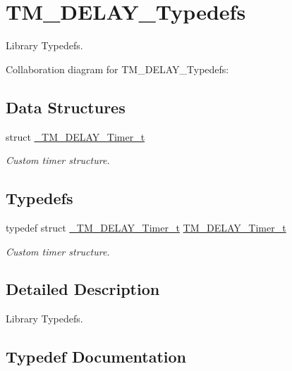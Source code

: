 \hypertarget{group___t_m___d_e_l_a_y___typedefs}{}\section{T\+M\+\_\+\+D\+E\+L\+A\+Y\+\_\+\+Typedefs}
\label{group___t_m___d_e_l_a_y___typedefs}


Library Typedefs.  


Collaboration diagram for T\+M\+\_\+\+D\+E\+L\+A\+Y\+\_\+\+Typedefs\+:
\subsection*{Data Structures}
\begin{DoxyCompactItemize}
\item 
struct \hyperlink{struct___t_m___d_e_l_a_y___timer__t}{\+\_\+\+T\+M\+\_\+\+D\+E\+L\+A\+Y\+\_\+\+Timer\+\_\+t}
\begin{DoxyCompactList}\small\item\em Custom timer structure. \end{DoxyCompactList}\end{DoxyCompactItemize}
\subsection*{Typedefs}
\begin{DoxyCompactItemize}
\item 
typedef struct \hyperlink{struct___t_m___d_e_l_a_y___timer__t}{\+\_\+\+T\+M\+\_\+\+D\+E\+L\+A\+Y\+\_\+\+Timer\+\_\+t} \hyperlink{group___t_m___d_e_l_a_y___typedefs_gaf0beeb077a757f34c8b176464d9a0e85}{T\+M\+\_\+\+D\+E\+L\+A\+Y\+\_\+\+Timer\+\_\+t}
\begin{DoxyCompactList}\small\item\em Custom timer structure. \end{DoxyCompactList}\end{DoxyCompactItemize}


\subsection{Detailed Description}
Library Typedefs. 



\subsection{Typedef Documentation}
\mbox{\label{group___t_m___d_e_l_a_y___typedefs_gaf0beeb077a757f34c8b176464d9a0e85}} 
